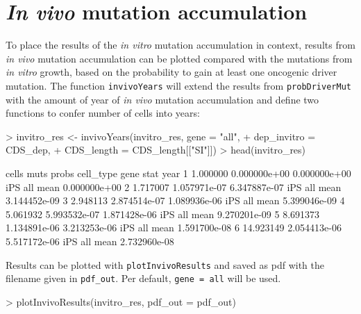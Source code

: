 \documentclass{article}
\begin{document}
\newpage{}

\section{\textit{In vivo} mutation accumulation}

To place the results of the \textit{in vitro} mutation accumulation
in context, results from \textit{in vivo} mutation accumulation can be plotted
compared with the mutations from \textit{in vitro} growth, based on the 
probability to gain at least one oncogenic driver mutation. The function 
\texttt{invivoYears} will extend the results from \texttt{probDriverMut} with
the amount of year of \textit{in vivo} mutation accumulation and define two
functions to confer number of cells into years:

\begin{Schunk}
\begin{Sinput}
> invitro_res <- invivoYears(invitro_res, gene = "all", 
+                            dep_invitro = CDS_dep, 
+                            CDS_length = CDS_length[["SI"]])
> head(invitro_res)
\end{Sinput}
\begin{Soutput}
      cells         muts        probs cell_type gene stat         year
1  1.000000 0.000000e+00 0.000000e+00       iPS  all mean 0.000000e+00
2  1.717007 1.057971e-07 6.347887e-07       iPS  all mean 3.144452e-09
3  2.948113 2.874514e-07 1.089936e-06       iPS  all mean 5.399046e-09
4  5.061932 5.993532e-07 1.871428e-06       iPS  all mean 9.270201e-09
5  8.691373 1.134891e-06 3.213253e-06       iPS  all mean 1.591700e-08
6 14.923149 2.054413e-06 5.517172e-06       iPS  all mean 2.732960e-08
\end{Soutput}
\end{Schunk}

Results can be plotted with \texttt{plotInvivoResults} and saved as pdf with 
the filename given in \texttt{pdf\_out}. Per default, \texttt{gene = all} will
be used.

\begin{Schunk}
\begin{Sinput}
> plotInvivoResults(invitro_res, pdf_out = pdf_out)
\end{Sinput}
\end{Schunk}
\end{document}
